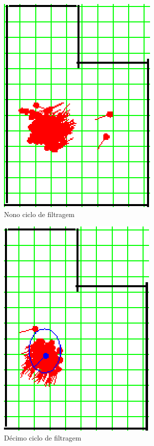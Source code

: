 \begin{figure}[H]
  \centering
  \includegraphics[scale=0.6]{figuras/cen1_ex2/10.eps}
  \caption[Nono Ciclo de Filtragem]{Nono ciclo de filtragem}
  \label{img:cen1_ex2_10}
\end{figure}

\begin{figure}[H]
  \centering
  \includegraphics[scale=0.6]{figuras/cen1_ex2/11.eps}
  \caption[Décimo Ciclo de Filtragem]{Décimo ciclo de filtragem}
  \label{img:cen1_ex2_11}
\end{figure}

